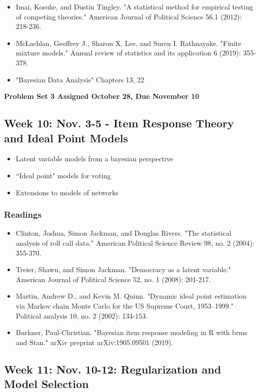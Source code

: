 \documentclass[11pt, article, oneside]{memoir}
\theoremstyle{Assumption}
\begin{document}
\begin{itemize}
\item Imai, Kosuke, and Dustin Tingley. "A statistical method for empirical testing of competing theories." American Journal of Political Science 56.1 (2012): 218-236.
\item McLachlan, Geoffrey J., Sharon X. Lee, and Suren I. Rathnayake. "Finite mixture models." Annual review of statistics and its application 6 (2019): 355-378.
\item "Bayesian Data Analysis" Chapters 13, 22
\end{itemize}

\textbf{Problem Set 3 Assigned October 28, Due November 10}

\subsection{Week 10: Nov. 3-5 - Item Response Theory and Ideal Point Models}

\begin{itemize}
\item Latent variable models from a bayesian perspective
\item ``Ideal point" models for voting
\item Extensions to models of networks 
\end{itemize}

\subsubsection*{Readings}

\begin{itemize}
\item Clinton, Joshua, Simon Jackman, and Douglas Rivers. "The statistical analysis of roll call data." American Political Science Review 98, no. 2 (2004): 355-370.
\item Treier, Shawn, and Simon Jackman. "Democracy as a latent variable." American Journal of Political Science 52, no. 1 (2008): 201-217.
\item Martin, Andrew D., and Kevin M. Quinn. "Dynamic ideal point estimation via Markov chain Monte Carlo for the US Supreme Court, 1953–1999." Political analysis 10, no. 2 (2002): 134-153.
\item Burkner, Paul-Christian. "Bayesian item response modeling in R with brms and Stan." arXiv preprint arXiv:1905.09501 (2019).
\end{itemize}


\subsection{Week 11: Nov. 10-12: Regularization and Model Selection}
\end{document}
